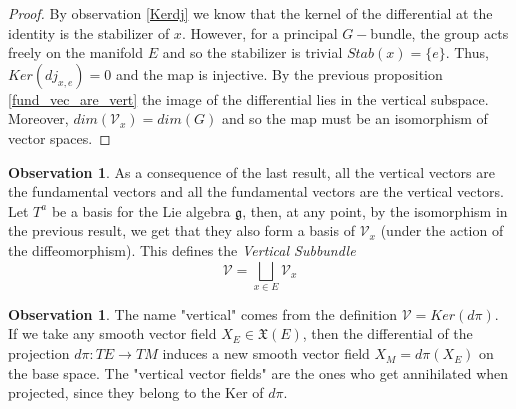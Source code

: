 \documentclass[12pt,a4paper]{report}
\theoremstyle{definition}
\theoremstyle{Theorem}
\theoremstyle{definition}
\theoremstyle{definition}
\newtheorem{Obs}[Def]{Observation}
\begin{document}
	\begin{proof}
		By observation \ref{Kerdj} we know that the kernel of the differential at the identity is the stabilizer of $x$. However, for a principal $G-$bundle, the group acts freely on the manifold $E$ and so the stabilizer is trivial $Stab(x)=\{e\}$. Thus, $Ker (dj_{x,e})=0$ and the map is injective. By the previous proposition \ref{fund_vec_are_vert} the image of the differential lies in the vertical subspace. Moreover, $dim(\mathcal{V}_{x})=dim(G)$ and so the map must be an isomorphism of vector spaces.			
	\end{proof}
	\begin{Obs}
		As a consequence of the last result, all the vertical vectors are the fundamental vectors and all the fundamental vectors are the vertical vectors.\\
		Let $T^a$ be a basis for the Lie algebra $\mathfrak{g}$, then, at any point, by the isomorphism in the previous result, we get that they also form a basis of $\mathcal{V}_{x}$ (under the action of the diffeomorphism). This defines the \textit{Vertical Subbundle} $$\mathcal{V}=\bigsqcup_{x\in E}\mathcal{V}_{x}$$
	\end{Obs}
	\begin{Obs}
		The name "vertical" comes from the definition $\mathcal{V}=Ker(d\pi)$. If we take any smooth vector field $X_E\in\mathfrak{X}(E)$, then the differential of the projection $d\pi:TE\rightarrow TM$ induces a new smooth vector field $X_M=d\pi (X_E)$ on the base space. The "vertical vector fields" are the ones who get annihilated when projected, since they belong to the Ker of $d\pi$.
	\end{Obs}
\end{document}
